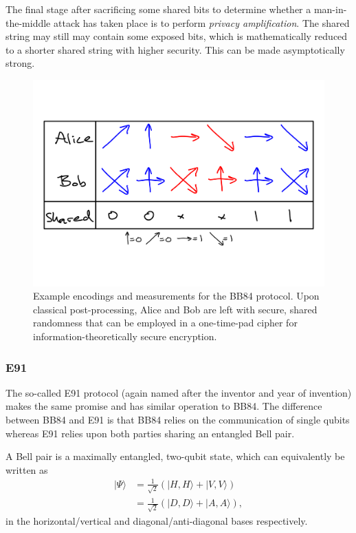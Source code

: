The final stage after sacrificing some shared bits to determine whether a man-in-the-middle attack has taken place is to perform \emph{privacy amplification}. The shared string may still may contain some exposed bits, which is mathematically reduced to a shorter shared string with higher security. This can be made asymptotically strong.

\begin{figure}[!htb]
	\centering
	\includegraphics[width=\columnwidth]{figures/BB84}
	\caption{Example encodings and measurements for the BB84 protocol. Upon classical post-processing, Alice and Bob are left with secure, shared randomness that can be employed in a one-time-pad cipher for information-theoretically secure encryption.} \label{fig:BB84}
\end{figure}

\subsubsection{E91} \label{e91}

The so-called E91 protocol (again named after the inventor and year of invention) \cite{bib:ekert1991quantum} makes the same promise and has similar operation to BB84. The difference between BB84 and E91 is that BB84 relies on the communication of single qubits whereas E91 relies upon both parties sharing an entangled Bell pair.

A Bell pair is a maximally entangled, two-qubit state, which can equivalently be written as
\begin{align}
	|\Psi\rangle &= \frac{1}{\sqrt{2}}(|H,H\rangle+|V,V\rangle)\nonumber\\
	&= \frac{1}{\sqrt{2}}(|D,D\rangle+|A,A\rangle),
\end{align}
in the horizontal/vertical and diagonal/anti-diagonal bases respectively. 

